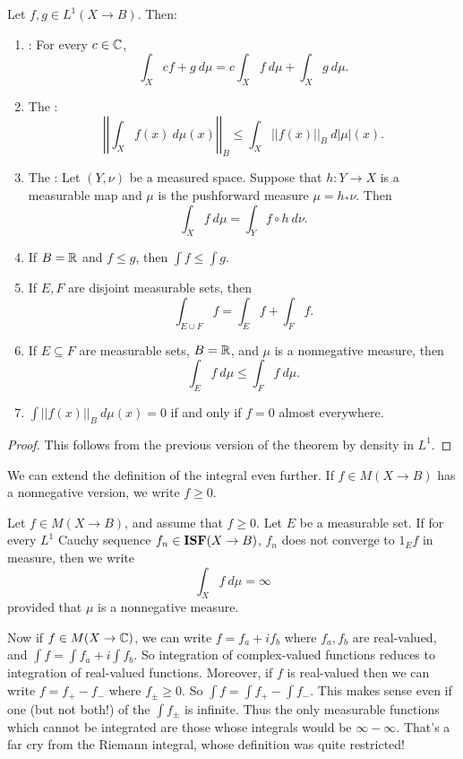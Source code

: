 \begin{theorem}
Let $f,g \in L^1(X \to B)$. Then:
\begin{enumerate}
\item {}: For every $c \in \mathbb{C}$,
$$\int_X cf + g~d\mu = c\int_X f ~d\mu + \int_X g~d\mu.$$
\item The :
$$\left|\left|\int_X f(x) ~d\mu(x)\right|\right|_B \leq \int_X ||f(x)||_B~d|\mu|(x).$$
\item The : Let $(Y, \nu)$ be a measured space. Suppose that $h: Y \to X$ is a measurable map and $\mu$ is the pushforward measure $\mu = h_*\nu$. Then
$$\int_X f~d\mu = \int_Y f \circ h~d\nu.$$
\item If $B = \mathbb{R}$ and $f \leq g$, then $\int f \leq \int g$.
\item If $E,F$ are disjoint measurable sets, then
$$\int_{E \cup F} f = \int_E f + \int_F f.$$
\item If $E \subseteq F$ are measurable sets, $B = \mathbb{R}$, and $\mu$ is a nonnegative measure, then
$$\int_E f~d\mu \leq \int_F f~d\mu.$$
\item $\int ||f(x)||_B ~d\mu(x) = 0$ if and only if $f = 0$ almost everywhere.
\end{enumerate}
\end{theorem}
\begin{proof}
This follows from the previous version of the theorem by density in $L^1$.
\end{proof}

\begin{subsec}
We can extend the definition of the integral even further.
If $f \in M(X \to B)$ has a nonnegative version, we write $f \geq 0$.
\end{subsec}

\begin{definition}
Let $f \in M(X \to B)$, and assume that $f \geq 0$. Let $E$ be a measurable set. If for every $L^1$ Cauchy sequence $f_n \in \mathbf{ISF}(X \to B)$, $f_n$ does not converge to $1_E f$ in measure, then we write
$$\int_X f ~d\mu = \infty$$
provided that $\mu$ is a nonnegative measure.
\end{definition}

\begin{subsec}
Now if $f \in M(X \to \mathbb{C})$, we can write $f = f_a + if_b$ where $f_a, f_b$ are real-valued, and $\int f = \int f_a + i\int f_b$.
So integration of complex-valued functions reduces to integration of real-valued functions. Moreover, if $f$ is real-valued then we can write $f = f_+ - f_-$ where $f_\pm \geq 0$. So $\int f = \int f_+ - \int f_-$.
This makes sense even if one (but not both!) of the $\int f_\pm$ is infinite.
Thus the only measurable functions which cannot be integrated are those whose integrals would be $\infty - \infty$.
That's a far cry from the Riemann integral, whose definition was quite restricted!
\end{subsec}

